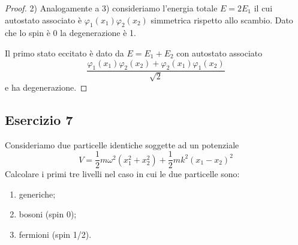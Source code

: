 \begin{proof}
2) Analogamente a 3) consideriamo l'energia totale $E = 2E_1$ il cui autostato associato \`e $\varphi_1(x_1)\varphi_2(x_2)$ simmetrica rispetto allo scambio. Dato che lo spin \`e 0 la degenerazione \`e 1.

Il primo stato eccitato \`e dato da $E = E_1 +E_2$ con autostato associato
\begin{equation*}
	\frac{\varphi_1(x_1)\varphi_2(x_2)+\varphi_2(x_1)\varphi_1(x_2)}{\sqrt{2}}
\end{equation*}
e ha degenerazione.

\end{proof}

\subsection{Esercizio 7}

Consideriamo due particelle identiche soggette ad un potenziale
\begin{equation*}
	V = \frac{1}{2}m \omega^2(x_1^2+x_2^2) + \frac{1}{2}mk^2(x_1-x_2)^2
\end{equation*}
Calcolare i primi tre livelli nel caso in cui le due particelle sono:
\begin{enumerate}
	\item generiche;
	\item bosoni (spin 0);
	\item fermioni (spin 1/2).
\end{enumerate}

